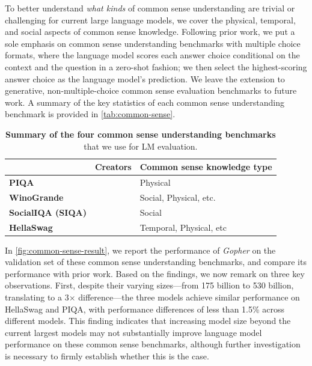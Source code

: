 \documentclass[11pt, a4paper, logo, internal, copyright, nonumbering]{deepmind}
\newcommand{\gopher}{\textit{Gopher}\xspace}
\begin{document}
To better understand {\it what kinds} of common sense understanding are trivial or challenging for current large language models, we cover the physical, temporal, and social aspects of common sense knowledge. Following prior work, we put a sole emphasis on common sense understanding benchmarks with multiple choice formats, where the language model scores each answer choice conditional on the context and the question in a zero-shot fashion; we then select the highest-scoring answer choice as the language model's prediction. We leave the extension to generative, non-multiple-choice common sense evaluation benchmarks to future work. A summary of the key statistics of each common sense understanding benchmark is provided in \autoref{tab:common-sense}.

\begin{table}[h]
\centering
\begin{tabular}{@{}ll|l@{}}
\toprule
   & \textbf{Creators} &  \textbf{Common sense knowledge type} \\ \midrule
\textbf{PIQA} & \citet{piqa}                         & Physical                                       \\
\textbf{WinoGrande} & \citet{winogrande}                         & Social, Physical, etc.                       \\
\textbf{SocialIQA (SIQA)} & \citet{socialiqa}                          & Social                                           \\
\textbf{HellaSwag} & \citet{hellaswag}                           & Temporal, Physical, etc                        \\
 \bottomrule
\end{tabular}

 \caption{\textbf{Summary of the four common sense understanding benchmarks} that we use for LM evaluation.}
 \label{tab:common-sense}
\end{table}

In \autoref{fig:common-sense-result}, we report the performance of \gopher on the validation set of these common sense understanding benchmarks, and compare its performance with prior work. Based on the findings, we now remark on three key observations. 
First, despite their varying sizes---from 175 billion to 530 billion, translating to a 3$\times$ difference---the three models achieve similar performance on HellaSwag and PIQA, with performance differences of less than 1.5\% across different models. This finding indicates that increasing model size beyond the current largest models may not substantially improve language model performance on these common sense benchmarks, although further investigation is necessary to firmly establish whether this is the case.
\end{document}
